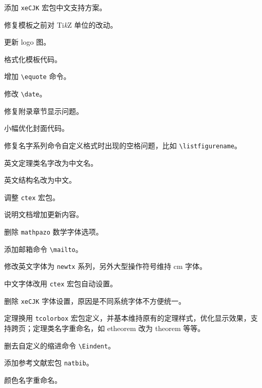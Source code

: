 \documentclass[lang=cn,newtx,10pt,scheme=chinese]{elegantbook}
\begin{document}

\begin{change}
  \item 添加 \lstinline{xeCJK} 宏包中文支持方案。
  \item 修复模板之前对 Ti\textit{k}Z 单位的改动。
  \item 更新 logo 图。
\end{change}


\begin{change}
  \item 格式化模板代码。
  \item 增加 \lstinline{\equote} 命令。
  \item 修改 \lstinline{\date}。
\end{change}


\begin{change}
  \item 修复附录章节显示问题。
  \item 小幅优化封面代码。
\end{change}


\begin{change}
  \item 修复名字系列命令自定义格式时出现的空格问题，比如 \lstinline{\listfigurename}。
  \item 英文定理类名字改为中文名。
  \item 英文结构名改为中文。
\end{change}


\begin{change}
  \item 调整 \lstinline{ctex} 宏包。
  \item 说明文档增加更新内容。
\end{change}


\begin{change}
  \item 删除 \lstinline{mathpazo} 数学字体选项。
  \item 添加邮箱命令 \lstinline{\mailto}。
  \item 修改英文字体为 \lstinline{newtx} 系列，另外大型操作符号维持 cm 字体。
  \item 中文字体改用 \lstinline{ctex} 宏包自动设置。
  \item 删除 \lstinline{xeCJK} 字体设置，原因是不同系统字体不方便统一。
  \item 定理换用 \lstinline{tcolorbox} 宏包定义，并基本维持原有的定理样式，优化显示效果，支持跨页；定理类名字重命名，如 etheorem 改为 theorem 等等。
  \item 删去自定义的缩进命令 \lstinline{\Eindent}。
  \item 添加参考文献宏包 \lstinline{natbib}。
  \item 颜色名字重命名。
\end{change}
\end{document}
